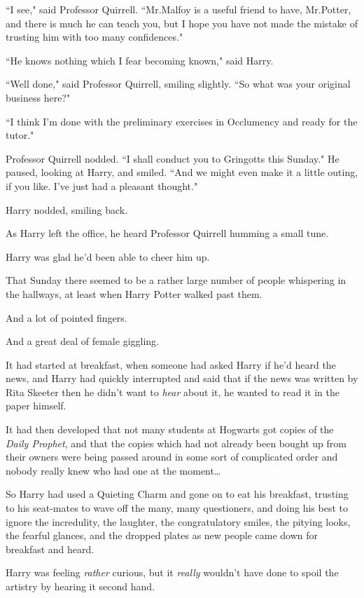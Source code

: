 ``I see," said Professor Quirrell. ``Mr.\?Malfoy is a useful friend to have, Mr.\?Potter, and there is much he can teach you, but I hope you have not made the mistake of trusting him with too many confidences."

``He knows nothing which I fear becoming known," said Harry.

``Well done," said Professor Quirrell, smiling slightly. ``So what was your original business here?"

``I think I'm done with the preliminary exercises in Occlumency and ready for the tutor."

Professor Quirrell nodded. ``I shall conduct you to Gringotts this Sunday." He paused, looking at Harry, and smiled. ``And we might even make it a little outing, if you like. I've just had a pleasant thought."

Harry nodded, smiling back.

As Harry left the office, he heard Professor Quirrell humming a small tune.

Harry was glad he'd been able to cheer him up.

\later

That Sunday there seemed to be a rather large number of people whispering in the hallways, at least when Harry Potter walked past them.

And a lot of pointed fingers.

And a great deal of female giggling.

It had started at breakfast, when someone had asked Harry if he'd heard the news, and Harry had quickly interrupted and said that if the news was written by Rita Skeeter then he didn't want to \emph{hear} about it, he wanted to read it in the paper himself.

It had then developed that not many students at Hogwarts got copies of the \emph{Daily Prophet}, and that the copies which had not already been bought up from their owners were being passed around in some sort of complicated order and nobody really knew who had one at the moment{\ldots}

So Harry had used a Quieting Charm and gone on to eat his breakfast, trusting to his seat-mates to wave off the many, many questioners, and doing his best to ignore the incredulity, the laughter, the congratulatory smiles, the pitying looks, the fearful glances, and the dropped plates as new people came down for breakfast and heard.

Harry was feeling \emph{rather} curious, but it \emph{really} wouldn't have done to spoil the artistry by hearing it second hand.

